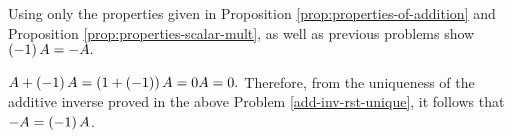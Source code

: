 \begin{enumialphparenastyle}
\begin{ex} Using only the properties given in Proposition \ref{prop:properties-of-addition} and 
Proposition \ref{prop:properties-scalar-mult}, as well as previous
problems show $\left(-1\right) A=-A.$
\begin{sol}
$A+\left(-1\right) A=\left(1+\left(
-1\right) \right) A=0A=0.$ Therefore, from the uniqueness of the additive
inverse proved in the above Problem \ref{add-inv-rst-unique}, it follows that $
-A=\left(-1\right) A$.
\end{sol}
\end{ex}

\end{enumialphparenastyle}